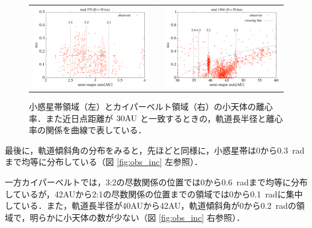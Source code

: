 \documentclass[11pt,a4paper,oneside,onecolumn]{jreport}
\begin{document}
\begin{figure}[H]
\begin{tabular}{ccc}
\begin{minipage}[t]{0.45\hsize}
\centering
\includegraphics[width=8cm]{./image/mainbelt_ecc.pdf}
\end{minipage} &
\begin{minipage}[t]{0.1\hsize}
\end{minipage} &
\begin{minipage}[t]{0.45\hsize}
\centering
\includegraphics[width=8cm]{./image/kuiperbelt_ecc.pdf}
\end{minipage}\\
%
\end{tabular}
\caption{小惑星帯領域（左）とカイパーベルト領域（右）の小天体の離心率．また近日点距離が $30 {\rm AU}$ と一致するときの，軌道長半径と離心率の関係を曲線で表している．\label{fig:obs_ecc}}
\end{figure}

最後に，軌道傾斜角の分布をみると，先ほどと同様に，小惑星帯は0から0.3\ radまで均等に分布している（図 \ref{fig:obs_inc} 左参照）．

一方カイパーベルトでは，3:2の尽数関係の位置では0から0.6\ radまで均等に分布しているが，42AUから2:1の尽数関係の位置までの領域では0から0.1\ radに集中している．また，軌道長半径が40AUから42AU，軌道傾斜角が0から0.2\ radの領域で，明らかに小天体の数が少ない（図 \ref{fig:obs_inc} 右参照）．
\end{document}
